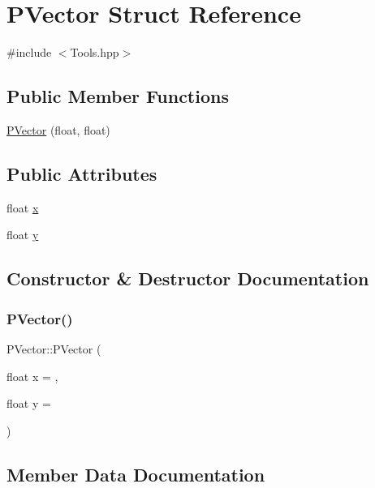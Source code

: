 \hypertarget{struct_p_vector}{}\section{P\+Vector Struct Reference}
\label{struct_p_vector}


{\ttfamily \#include $<$Tools.\+hpp$>$}

\subsection*{Public Member Functions}
\begin{DoxyCompactItemize}
\item 
\hyperlink{struct_p_vector_aaed7f72779101199eb499892e000f7e8}{P\+Vector} (float, float)
\end{DoxyCompactItemize}
\subsection*{Public Attributes}
\begin{DoxyCompactItemize}
\item 
float \hyperlink{struct_p_vector_ae8b1d40fd11089e7949cb333cf949d13}{x}
\item 
float \hyperlink{struct_p_vector_a63d91c43b923e9e63f1fb1e0598b5962}{y}
\end{DoxyCompactItemize}


\subsection{Constructor \& Destructor Documentation}
\hypertarget{struct_p_vector_aaed7f72779101199eb499892e000f7e8}{}\label{struct_p_vector_aaed7f72779101199eb499892e000f7e8} 
\subsubsection{\texorpdfstring{P\+Vector()}{PVector()}}
{\footnotesize\ttfamily P\+Vector\+::\+P\+Vector (\begin{DoxyParamCaption}\item[{float}]{x = {},  }\item[{float}]{y = {} }\end{DoxyParamCaption})}



\subsection{Member Data Documentation}
\hypertarget{struct_p_vector_ae8b1d40fd11089e7949cb333cf949d13}{}\label{struct_p_vector_ae8b1d40fd11089e7949cb333cf949d13} 
